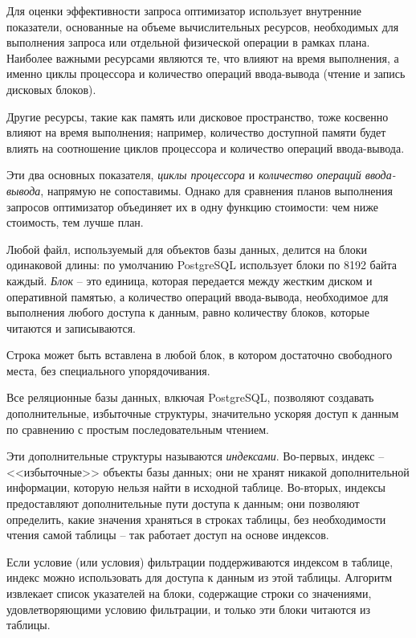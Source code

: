\documentclass[%
	11pt,
	a4paper,
	utf8,
		]{article}
\begin{document}

Для оценки эффективности запроса оптимизатор использует внутренние показатели, основанные на объеме вычислительных ресурсов, необходимых для выполнения запроса или отдельной физической операции в рамках плана. Наиболее важными ресурсами являются те, что влияют на время выполнения, а именно циклы процессора и количество операций ввода-вывода (чтение и запись дисковых блоков).

Другие ресурсы, такие как память или дисковое пространство, тоже косвенно влияют на время выполнения; например, количество доступной памяти будет влиять на соотношение циклов процессора и количество операций ввода-вывода.

Эти два основных показателя, \emph{циклы процессора} и \emph{количество операций ввода-вывода}, напрямую не сопоставимы. Однако для сравнения планов выполнения запросов оптимизатор объединяет их в одну функцию стоимости: чем ниже стоимость, тем лучше план.

Любой файл, используемый для объектов базы данных, делится на блоки одинаковой длины: по умолчанию PostgreSQL использует блоки по 8192 байта каждый. \emph{Блок} -- это единица, которая передается между жестким диском и оперативной памятью, а количество операций ввода-вывода, необходимое для выполнения любого доступа к данным, равно количеству блоков, которые читаются и записываются.

Строка может быть вставлена в любой блок, в котором достаточно свободного места, без специального упорядочивания.

Все реляционные базы данных, влкючая PostgreSQL, позволяют создавать дополнительные, избыточные структуры, значительно ускоряя доступ к данным по сравнению с простым последовательным чтением.

Эти дополнительные структуры называются \emph{индексами}. Во-первых, индекс -- <<избыточные>> объекты базы данных; они не хранят никакой дополнительной информации, которую нельзя найти в исходной таблице. Во-вторых, индексы предоставляют дополнительные пути доступа к данным; они позволяют определить, какие значения храняться в строках таблицы, без необходимости чтения самой таблицы -- так работает доступ на основе индексов.

Если условие (или условия) фильтрации поддерживаются индексом в таблице, индекс можно использовать для доступа к данным из этой таблицы. Алгоритм извлекает список указателей на блоки, содержащие строки со значениями, удовлетворяющими условию фильтрации, и только эти блоки читаются из таблицы.
\end{document}
